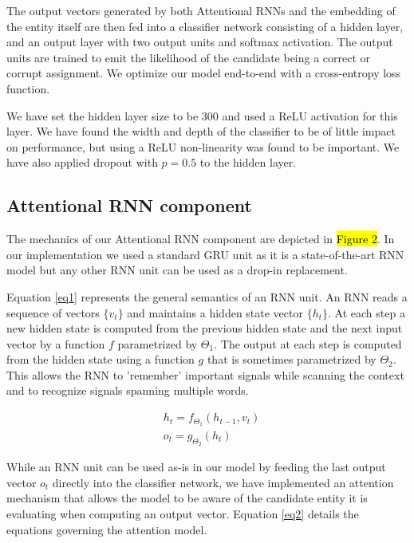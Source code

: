 \documentclass[11pt]{article}
\begin{document}
	The output vectors generated by both Attentional RNNs and the embedding of the entity itself are then fed into a classifier network consisting of a hidden layer, and an output layer with two output units and softmax activation. The output units are trained to emit the likelihood of the candidate being a correct or corrupt assignment. We optimize our model end-to-end with a cross-entropy loss function. 
	
	We have set the hidden layer size to be 300 and used a ReLU activation for this layer. We have found the width and depth of the classifier to be of little impact on performance, but using a ReLU non-linearity was found to be important. We have also applied dropout with $p=0.5$ to the hidden layer.

	\subsection{Attentional RNN component}
	
	The mechanics of our Attentional RNN component are depicted in \hl{Figure 2}. In our implementation we used a standard GRU unit \cite{cho2014learning} as it is a state-of-the-art RNN model but any other RNN unit can be used as a drop-in replacement. 
		
	Equation \ref{eq1} represents the general semantics of an RNN unit. An RNN reads a sequence of vectors $\{v_t\}$ and maintains a hidden state vector $\{h_t\}$. At each step a new hidden state is computed from the previous hidden state and the next input vector by a function $f$ parametrized by $\Theta_1$. The output at each step is computed from the hidden state using a function $g$ that is sometimes parametrized by $\Theta_2$. This allows the RNN to 'remember' important signals while scanning the context and to recognize signals spanning multiple words.
	
	\begin{equation}
	\label{eq1}
	\begin{aligned}
	& h_t=f_{\Theta_1}(h_{t-1}, v_t) \\
	& o_t=g_{\Theta_2}(h_t)
	\end{aligned}
	\end{equation}

	While an RNN unit can be used as-is in our model by feeding the last output vector $o_t$ directly into the classifier network, we have implemented an attention mechanism that allows the model to be aware of the candidate entity it is evaluating when computing an output vector. Equation \ref{eq2} details the equations governing the attention model.
	
\end{document}
